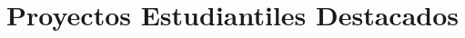 \documentclass[aspectratio=169,compress]{beamer}
\begin{document}
%
%
%
%
%
%

%
%

%
%

%










\section{Proyectos Estudiantiles Destacados} 


%
%
%
%
%
%
%


%
%
%
%
%
%
\end{document}
